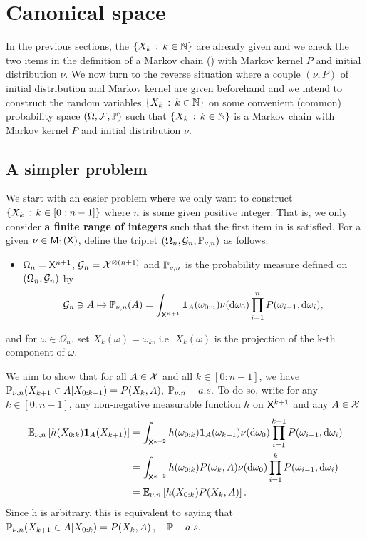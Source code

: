 \documentclass[english,graybox,envcountchap,envcountsame,sectrefs,shortlabels]{svmono}
\theoremstyle{style}
\begin{document}
\section{Canonical space} 

In the previous sections, the $\left\{ X_{k}\,:\,k\in\mathbb{N}\right\}$
are already given and we check the two items in the definition of
a Markov chain () with Markov kernel $P$ and initial
distribution $\nu$. We now turn to the reverse situation where a
couple $(\nu,P)$  of initial distribution and Markov kernel are given
beforehand and we intend to construct the random variables $\left\{ X_{k}\,:\,k\in\mathbb{N}\right\}$
on some convenient (common) probability space $(\Omega,\mathcal{F},\mathbb{P})$
such that $\left\{ X_{k}\,:\,k\in\mathbb{N}\right\}$ is a Markov chain with Markov
kernel $P$ and initial distribution $\nu$.

\subsection{A simpler problem }

We start with an easier problem where we only want to construct $\left\{ X_{k}\,:\,k\in[0:n-1]\right\}$
where $n$ is some given positive integer. That is, we only consider
\textbf{a finite range of integers} such that the first item in 
is satisfied. For a given $\nu\in\mathsf{M}_{1}(\mathsf{X})$, define the triplet
$(\Omega_{n},\mathcal{G}_{n},\mathbb{P}_{\nu,n})$ as follows:
\begin{itemize}
\item $\Omega_{n}=\mathsf{X}^{n+1}$, $\mathcal{G}_{n}=\mathcal{X}^{\otimes(n+1)}$ and
$\mathbb{P}_{\nu,n}$ is the probability measure defined on $(\Omega_{n},\mathcal{G}_{n})$
by
\[
\mathcal{G}_{n}\ni A\mapsto\mathbb{P}_{\nu,n}(A)=\int_{\mathsf{X}^{n+1}}\mathbf{1}_{A}(\omega_{0:n})\nu(\mathrm{d}\omega_{0})\prod_{i=1}^{n}P(\omega_{i-1},\mathrm{d}\omega_{i}),
\]
\end{itemize}
and for $\omega\in\Omega_{n}$, set $X_{k}(\omega)=\omega_{k}$, i.e.
$X_{k}(\omega)$ is the projection of the k-th component of $\omega$.

We aim to show that for all $A\in\mathcal{X}$ and all $k\in[0:n-1]$,
we have $\mathbb{P}_{\nu,n}(X_{k+1}\in A|X_{0:k-1})=P(X_{k},A),\;\mathbb{P}_{\nu,n}-a.s.$
To do so, write for any $k\in[0:n-1]$, any non-negative measurable
function $h$ on $\mathsf{X}^{k+1}$ and any $A\in\mathcal{X}$
\begin{align*}
\mathbb{E}_{\nu,n}\left[h(X_{0:k})\mathbf{1}_{A}(X_{k+1})\right] & =\int_{\mathsf{X}^{k+2}}h(\omega_{0:k})\mathbf{1}_{A}(\omega_{k+1})\nu(\mathrm{d}\omega_{0})\prod_{i=1}^{k+1}P(\omega_{i-1},\mathrm{d}\omega_{i})\\
 & =\int_{\mathsf{X}^{k+2}}h(\omega_{0:k})P(\omega_{k},A)\nu(\mathrm{d}\omega_{0})\prod_{i=1}^{k}P(\omega_{i-1},\mathrm{d}\omega_{i})\\
 & =\mathbb{E}_{\nu,n}\left[h(X_{0:k})P(X_{k},A)\right].
\end{align*}
Since h is arbitrary, this is equivalent to saying that $\mathbb{P}_{\nu,n}(X_{k+1}\in A|X_{0:k})=P(X_{k},A)\,,\quad\mathbb{P}-a.s.$
\end{document}
